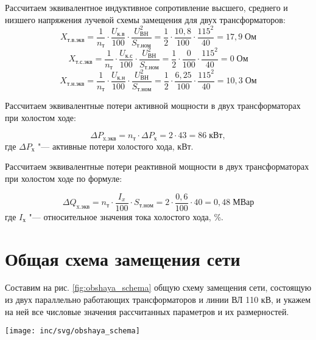 Рассчитаем эквивалентное индуктивное сопротивление высшего, среднего и низшего напряжения лучевой схемы замещения для двух трансформаторов:
\begin{equation*}
	X_{\text{т.в.экв}} = \frac{1}{n_{\text{т}}}\cdot \frac{U_{\text{к.в}}}{100}\cdot \frac{U_{\text{ВН}}^2}{S_{\text{т.ном}}} = \frac{1}{2}\cdot \frac{10,8}{100}\cdot \frac{115^2}{40} = 17,9\; \text{Ом}
\end{equation*}
\begin{equation*}
	X_{\text{т.с.экв}} = \frac{1}{n_{\text{т}}}\cdot \frac{U_{\text{к.с}}}{100}\cdot \frac{U_{\text{ВН}}^2}{S_{\text{т.ном}}} = \frac{1}{2}\cdot \frac{0}{100}\cdot \frac{115^2}{40} = 0\; \text{Ом}
\end{equation*}
\begin{equation*}
	X_{\text{т.н.экв}} = \frac{1}{n_{\text{т}}}\cdot \frac{U_{\text{к.н}}}{100}\cdot \frac{U_{\text{ВН}}^2}{S_{\text{т.ном}}} = \frac{1}{2}\cdot \frac{6,25}{100}\cdot \frac{115^2}{40} = 10,3\; \text{Ом}
\end{equation*}

Рассчитаем эквивалентные потери активной мощности в двух трансформаторах при холостом ходе:
\begin{eqndesc}
	\begin{equation*}
		\Delta P_{\text{x.экв}} = n_{\text{т}}\cdot \Delta P_{\text{х}} = 2\cdot 43 = 86\; \text{кВт},
	\end{equation*}
	где $\Delta P_{\text{х}}$ "--- активные потери холостого хода, кВт.
\end{eqndesc}

Рассчитаем эквивалентные потери реактивной мощности в двух трансформаторах при холостом ходе по формуле:
\begin{eqndesc}
	\begin{equation*}
		\Delta Q_{\text{x.экв}} = n_{\text{т}}\cdot \frac{I_x}{100}\cdot S_{\text{т.ном}} = 2\cdot \frac{0,6}{100}\cdot 40 = 0,48\; \text{МВар}
	\end{equation*}
	где $I_{\text{х}}$ "--- относительное значения тока холостого хода, \%.
\end{eqndesc}

\section{Общая схема замещения сети}

Составим на рис. \ref{fig:obshaya_schema} общую схему замещения сети, состоящую из двух параллельно работающих трансформаторов и линии ВЛ 110 кВ, и укажем на ней все числовые значения рассчитанных параметров и их размерностей.

\begin{sidewaysfigure}
	\centering
	\texttt{[image: inc/svg/obshaya\_schema]}
	\caption{Общая схема замещения двух параллельно работающих трансформаторов и ВЛ}
	\label{fig:obshaya_schema}
\end{sidewaysfigure}

